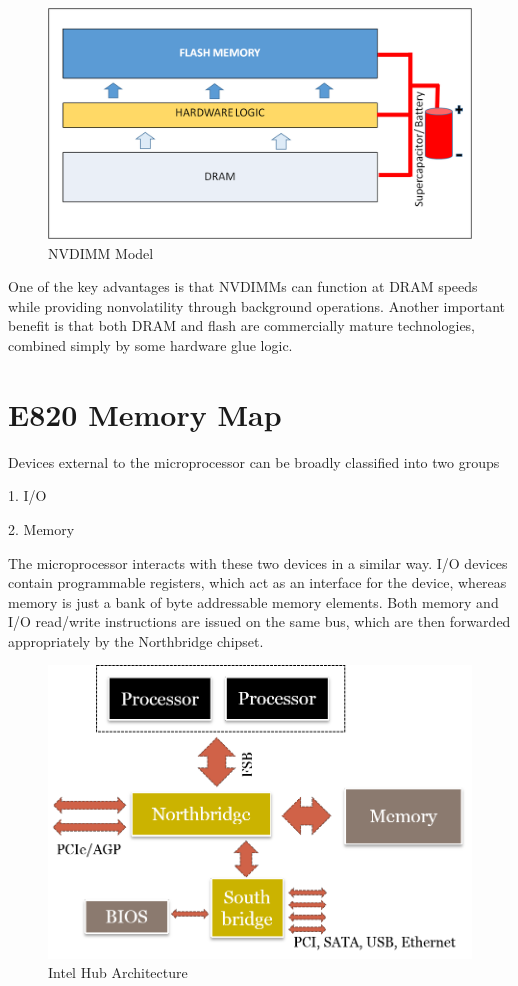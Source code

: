 \begin{figure}[H]
  \centering
  \includegraphics[scale=0.6]{figures/NVDIMM_Stack.png}
  \caption{NVDIMM Model}
  \label{fig:nvdimm}
\end{figure}
One of the key advantages is that NVDIMMs can function at DRAM speeds while providing nonvolatility through background operations. Another important benefit is that both DRAM and flash are commercially mature technologies, combined simply by some hardware glue logic. 

\section{E820 Memory Map}



Devices external to the microprocessor can be broadly classified into two groups

1. I/O

2. Memory

The microprocessor interacts with these two devices in a similar way. I/O devices contain programmable registers, which act as an interface for the device, whereas memory is just a bank of byte addressable memory elements. Both memory and I/O read/write instructions are issued on the same bus, which are then forwarded appropriately by the Northbridge chipset. 

\setlength{\belowcaptionskip}{-10pt}

\begin{figure}[H]
  \centering
  \includegraphics[scale=0.6]{figures/intelhubarchi.png}
  \caption{Intel Hub Architecture}
  \label{fig:intel_arch}
\end{figure}

